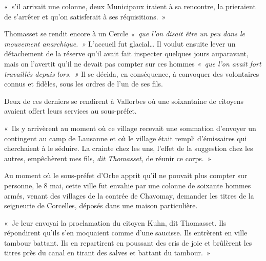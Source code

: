 \documentclass[french,twoside]{book} %
\newenvironment{quoteblock}%
  {\begin{quoting}}
  {\end{quoting}}
\newenvironment{quotebar}{%
    \def\FrameCommand{{\color{rubric!10!}\vrule width 0.5em} \hspace{0.9em}}%
    \def\OuterFrameSep{\itemsep} %
    \MakeFramed {\advance\hsize-\width \FrameRestore}
  }%
  {%
    \endMakeFramed
  }
\renewenvironment{quoteblock}%
  {%
    \savenotes
    \setstretch{0.9}
    \normalfont
    \begin{quotebar}
  }
  {%
    \end{quotebar}
    \spewnotes
  }
\begin{document}
\begin{quoteblock}
\noindent « s’il arrivait une colonne, deux Municipaux iraient à sa rencontre, la prieraient de s’arrêter et qu’on satisferait à ses réquisitions. »\end{quoteblock}

\noindent Thomasset se rendit encore à un Cercle \emph{« que l’on disait être un peu dans le mouvement anarchique. »} L’accueil fut glacial… Il voulut ensuite lever un détachement de la réserve qu’il avait fait inspecter quelques jours auparavant, mais on l’avertit qu’il ne devait pas compter sur ces hommes \emph{« que l’on avait fort travaillés depuis lors. »} Il se décida, en conséquence, à convoquer des volontaires connus et fidèles, sous les ordres de l’un de ses fils.\par
Deux de ces derniers se rendirent à Vallorbes où une soixantaine de citoyens avaient offert leurs services au sous-préfet.\par

\begin{quoteblock}
 \noindent « Ils y arrivèrent au moment où ce village recevait une sommation d’envoyer un contingent au camp de Lausanne et où le village était rempli d’émissaires qui cherchaient à le séduire. La crainte chez les uns, l’effet de la suggestion chez les autres, empêchèrent mes fils, \emph{dit Thomasset, }de réunir ce corps. »
 \end{quoteblock}

\noindent Au moment où le sous-préfet d’Orbe apprit qu’il ne pouvait plus compter sur personne, le 8 mai, cette ville fut envahie par une colonne de soixante hommes armés, venant des villages de la contrée de Chavomay, demander les titres de la seigneurie de Corcelles, déposés dans une maison particulière.\par

\begin{quoteblock}
 \noindent « Je leur envoyai la proclamation du citoyen Kuhn, dit Thomasset. Ils répondirent qu’ils s’en moquaient comme d’une saucisse. Ils entrèrent en ville tambour battant. Ils en repartirent en poussant des cris de joie et brûlèrent les titres près du canal en tirant des salves et battant du tambour. »
 \end{quoteblock}
\end{document}
